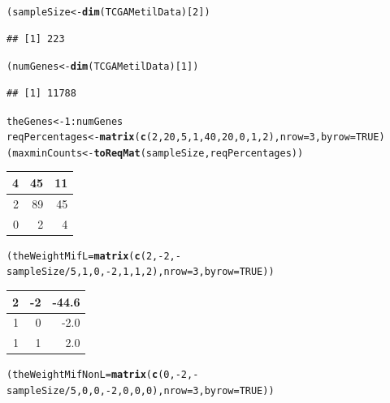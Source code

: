 \documentclass[a4paper,10pt]{article}\usepackage[]{graphicx}\usepackage[]{color}
\makeatletter
\newcommand{\hlnum}[1]{\textcolor[rgb]{0.686,0.059,0.569}{#1}}%
\newcommand{\hlopt}[1]{\textcolor[rgb]{0,0,0}{#1}}%
\newcommand{\hlstd}[1]{\textcolor[rgb]{0.345,0.345,0.345}{#1}}%
\newcommand{\hlkwb}[1]{\textcolor[rgb]{0.69,0.353,0.396}{#1}}%
\newcommand{\hlkwc}[1]{\textcolor[rgb]{0.333,0.667,0.333}{#1}}%
\newcommand{\hlkwd}[1]{\textcolor[rgb]{0.737,0.353,0.396}{\textbf{#1}}}%
\newenvironment{kframe}{%
 \def\at@end@of@kframe{}%
 \ifinner\ifhmode%
  \def\at@end@of@kframe{\end{minipage}}%
  \begin{minipage}{\columnwidth}%
 \fi\fi%
 \def\FrameCommand##1{\hskip\@totalleftmargin \hskip-\fboxsep
 \colorbox{shadecolor}{##1}\hskip-\fboxsep
     \hskip-\linewidth \hskip-\@totalleftmargin \hskip\columnwidth}%
 \MakeFramed {\advance\hsize-\width
   \@totalleftmargin\z@ \linewidth\hsize
   \@setminipage}}%
 {\par\unskip\endMakeFramed%
 \at@end@of@kframe}
\newenvironment{knitrout}{}{} %
\makeatother
\begin{document}
\begin{knitrout}
\color{fgcolor}\begin{kframe}
\begin{alltt}
\hlstd{(sampleSize} \hlkwb{<-} \hlkwd{dim}\hlstd{(TCGAMetilData)[}\hlnum{2}\hlstd{])}
\end{alltt}
\begin{verbatim}
## [1] 223
\end{verbatim}
\begin{alltt}
\hlstd{(numGenes} \hlkwb{<-}   \hlkwd{dim}\hlstd{(TCGAMetilData)[}\hlnum{1}\hlstd{])}
\end{alltt}
\begin{verbatim}
## [1] 11788
\end{verbatim}
\begin{alltt}
\hlstd{theGenes} \hlkwb{<-} \hlnum{1}\hlopt{:}\hlstd{numGenes}
\hlstd{reqPercentages} \hlkwb{<-} \hlkwd{matrix} \hlstd{(}\hlkwd{c}\hlstd{(}\hlnum{2}\hlstd{,} \hlnum{20}\hlstd{,} \hlnum{5}\hlstd{,} \hlnum{1}\hlstd{,} \hlnum{40}\hlstd{,} \hlnum{20}\hlstd{,} \hlnum{0}\hlstd{,} \hlnum{1}\hlstd{,} \hlnum{2}\hlstd{),} \hlkwc{nrow}\hlstd{=}\hlnum{3}\hlstd{,} \hlkwc{byrow}\hlstd{=}\hlnum{TRUE}\hlstd{)}
\hlstd{(maxminCounts} \hlkwb{<-} \hlkwd{toReqMat}\hlstd{(sampleSize, reqPercentages))}
\end{alltt}
\end{kframe}


\begin{tabular}{r|r|r}
\hline
4 & 45 & 11\\
\hline
2 & 89 & 45\\
\hline
0 & 2 & 4\\
\hline
\end{tabular}\begin{kframe}\begin{alltt}
\hlstd{(theWeightMifL}\hlkwb{=}\hlkwd{matrix} \hlstd{(}\hlkwd{c}\hlstd{(}\hlnum{2}\hlstd{,}\hlopt{-}\hlnum{2}\hlstd{,}\hlopt{-}\hlstd{sampleSize}\hlopt{/}\hlnum{5}\hlstd{,}\hlnum{1}\hlstd{,}\hlnum{0}\hlstd{,}\hlopt{-}\hlnum{2}\hlstd{,}\hlnum{1}\hlstd{,}\hlnum{1}\hlstd{,}\hlnum{2}\hlstd{),} \hlkwc{nrow}\hlstd{=}\hlnum{3}\hlstd{,} \hlkwc{byrow}\hlstd{=}\hlnum{TRUE}\hlstd{))}
\end{alltt}
\end{kframe}


\begin{tabular}{r|r|r}
\hline
2 & -2 & -44.6\\
\hline
1 & 0 & -2.0\\
\hline
1 & 1 & 2.0\\
\hline
\end{tabular}\begin{kframe}\begin{alltt}
\hlstd{(theWeightMifNonL}\hlkwb{=}\hlkwd{matrix} \hlstd{(}\hlkwd{c}\hlstd{(}\hlnum{0}\hlstd{,}\hlopt{-}\hlnum{2}\hlstd{,}\hlopt{-}\hlstd{sampleSize}\hlopt{/}\hlnum{5}\hlstd{,}\hlnum{0}\hlstd{,}\hlnum{0}\hlstd{,}\hlopt{-}\hlnum{2}\hlstd{,}\hlnum{0}\hlstd{,}\hlnum{0}\hlstd{,}\hlnum{0}\hlstd{),} \hlkwc{nrow}\hlstd{=}\hlnum{3}\hlstd{,} \hlkwc{byrow}\hlstd{=}\hlnum{TRUE}\hlstd{))}
\end{alltt}
\end{kframe}



\end{knitrout}
\end{document}
